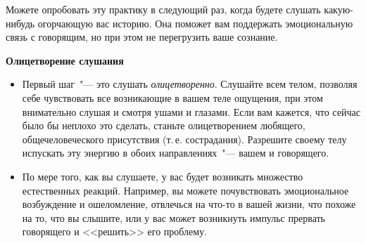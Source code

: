\newpage
{}

\newpage
{} \label{IP:Compassionate_Listening}

Можете опробовать эту практику в следующий раз, когда будете слушать какую-нибудь огорчающую вас историю. Она поможет вам поддержать эмоциональную связь с говорящим, но при этом не перегрузить ваше сознание. 

\vspace{2ex}

{\large \textbf{Олицетворение слушания}}
\begin{itemize}
	\item Первый шаг~"--- это слушать \emph{олицетворенно}. Слушайте всем телом, позволяя себе чувствовать все возникающие в вашем теле ощущения, при этом внимательно слушая и смотря ушами и глазами. Если вам кажется, что сейчас было бы неплохо это сделать, станьте олицетворением любящего, общечеловеческого присутствия (т.\,е. сострадания). Разрешите своему телу испускать эту энергию в обоих направлениях~"--- вашем и говорящего.
	
	\item По мере того, как вы слушаете, у вас будет возникать множество естественных реакций. Например, вы можете почувствовать эмоциональное возбуждение и ошеломление, отвлечься на что-то в вашей жизни, что похоже на то, что вы слышите, или у вас может возникнуть импульс прервать говорящего и <<решить>> его проблему.
\end{itemize}

